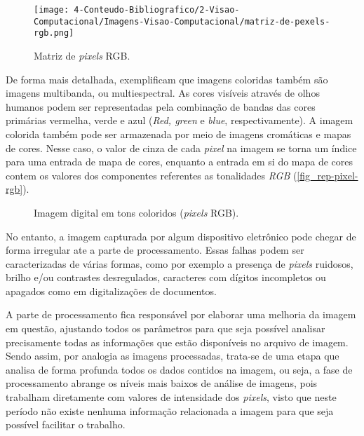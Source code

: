 \begin{figure}[h]
	\caption{\label{fig_rgb-representacao}Matriz de \textit{pixels} RGB.}
	\begin{center}
		\texttt{[image: 4-Conteudo-Bibliografico/2-Visao-Computacional/Imagens-Visao-Computacional/matriz-de-pexels-rgb.png]}
	\end{center}
	\centering {}
\end{figure}

De forma mais detalhada,  exemplificam que imagens coloridas também são imagens multibanda, ou multiespectral. As cores visíveis através de olhos humanos podem ser representadas pela combinação de bandas das cores primárias vermelha, verde e azul (\textit{Red, green} e \textit{blue}, respectivamente). A imagem colorida também pode ser armazenada por meio de imagens cromáticas e mapas de cores. Nesse caso, o valor de cinza de cada \textit{pixel} na imagem se torna um índice para uma entrada de mapa de cores, enquanto a entrada em si do mapa de cores contem os valores dos componentes referentes as tonalidades \textit{RGB} (\autoref{fig_rep-pixel-rgb}).

\begin{figure}[h]
	\caption{\label{fig_rep-pixel-rgb}Imagem digital em tons coloridos (\textit{pixels} RGB).}
	\begin{center}
	\end{center}
	\centering {}
\end{figure}

No entanto, a imagem capturada por algum dispositivo eletrônico pode chegar de forma irregular ate a parte de processamento. Essas falhas podem ser caracterizadas de várias formas, como por exemplo a presença de \textit{pixels} ruidosos, brilho e/ou contrastes desregulados, caracteres com dígitos incompletos ou apagados como em digitalizações de documentos.

A parte de processamento fica responsável por elaborar uma melhoria da imagem em questão, ajustando todos os parâmetros para que seja possível analisar precisamente todas as informações que estão disponíveis no arquivo de imagem. Sendo assim, por analogia as imagens processadas, trata-se de uma etapa que analisa de forma profunda todos os dados contidos na imagem, ou seja, a fase de processamento abrange os níveis mais baixos de análise de imagens, pois trabalham diretamente com valores de intensidade dos \textit{pixels}, visto que neste período não existe nenhuma informação relacionada a imagem para que seja possível facilitar o trabalho.